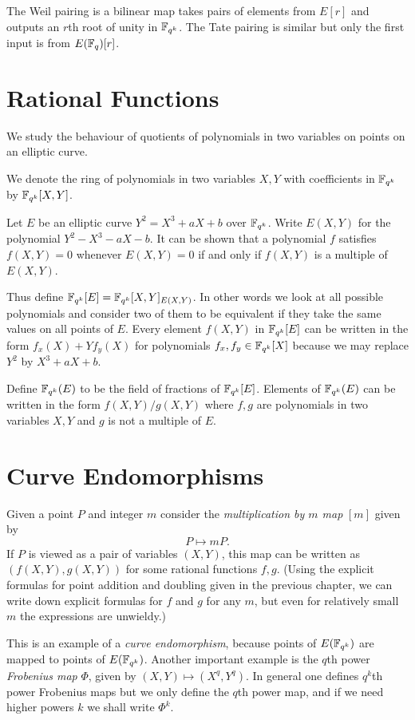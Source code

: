 The Weil pairing is a bilinear map
takes pairs of elements from $E[r]$ and outputs an $r$th root of unity
in $\mathbb{F}_{q^k}$. The Tate pairing is similar but only the first
input is from $E(\mathbb{F}_q)[r]$.

\section {Rational Functions}

We study the behaviour of quotients of polynomials in two variables on
points on an elliptic curve.

We denote the ring of polynomials in two variables $X,Y$
with coefficients in $\mathbb{F}_{q^k}$ by $\mathbb{F}_{q^k}[X,Y]$. 

Let $E$ be an elliptic curve $Y^2 = X^3 + aX + b$ over $\mathbb{F}_{q^k}$.
Write $E(X,Y)$ for the polynomial $Y^2 - X^3 - aX - b$.
It can be shown that a polynomial $f$ satisfies $f(X,Y) = 0$
whenever $E(X,Y) = 0$ if and only if $f(X,Y)$ is a multiple of $E(X,Y)$.

Thus define $\mathbb{F}_{q^k}[E] = \mathbb{F}_{q^k}[X,Y]_{E(X,Y)}$. In other words we look at all
possible polynomials and consider two of them to be
equivalent if they take the same values on all points of $E$.
Every element $f(X,Y)$ in $\mathbb{F}_{q^k}[E]$ can be written in the form
$f_x(X) + Y f_y(X)$ for polynomials $f_x, f_y \in \mathbb{F}_{q^k}[X]$ because
we may replace $Y^2$ by $X^3 + aX + b$.

Define $\mathbb{F}_{q^k}(E)$ to be the field of fractions of $\mathbb{F}_{q^k}[E]$.
Elements of $\mathbb{F}_{q^k}(E)$ can be written in the form
$f(X,Y) / g(X,Y)$ where $f, g$ are polynomials in two variables $X, Y$
and $g$ is not a multiple of $E$.

\section {Curve Endomorphisms}

Given a point $P$ and integer $m$ consider the \emph{multiplication by $m$ map}
$[m]$ given by \[ P \mapsto m P . \]
If $P$ is viewed as a pair of variables $(X,Y)$, this map
can be written as $(f(X,Y), g(X,Y))$ for some rational functions $f,g$.
(Using the explicit formulas for point addition and doubling
given in the previous chapter, we can write down
explicit formulas for $f$ and $g$ for any $m$, but even for relatively
small $m$ the expressions are unwieldy.)

This is an example of a \emph{curve endomorphism}, because points of
$E(\mathbb{F}_{q^k})$ are mapped to points of $E(\mathbb{F}_{q^k})$. Another important example
is the $q$th power \emph{Frobenius map} $\Phi$,
given by $(X, Y) \mapsto (X^{q}, Y^{q})$. In general one defines
$q^k$th power Frobenius maps but we only define the $q$th power map,
and if we need higher powers $k$ we shall write $\Phi^k$.

